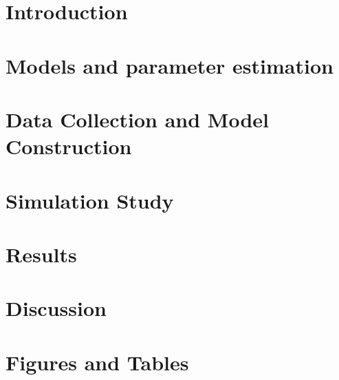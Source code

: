 \documentclass[12pt]{TD-CJS}
\begin{document}

%
%
\section{Introduction}

%
\section{Models and parameter estimation}

%
\section{Data Collection and Model Construction}

%
\section{Simulation Study}

%
\section{Results}
\label{sec:case_study}

\section{Discussion}

%
\newpage

%
\newpage
\begin{appendix}

\end{appendix}
%
\newpage
\section{Figures and Tables}

%
\end{document}
